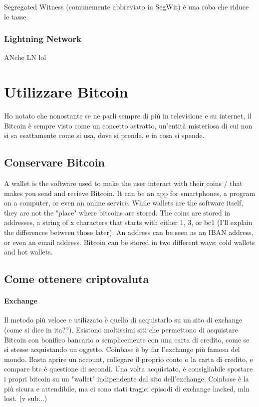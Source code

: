 \documentclass {article}
\begin{document}
Segregated Witness (comunemente abbreviato in SegWit) è una roba che riduce le tasse


\subsubsection {Lightning Network}


ANche LN lol


\section {Utilizzare Bitcoin}


Ho notato che nonostante se ne parli sempre di più in televisione e su internet, il Bitcoin è sempre visto come un concetto astratto, un'entità misteriosa di cui non si sa esattamente come si usa, dove si prende, e in cosa si spende.


\subsection {Conservare Bitcoin}


A wallet is the software used to make the user interact with their coins / that makes you send and recieve Bitcoin.
It can be an app for smartphones, a program on a computer, or even an online service.
While wallets are the software itself, they are not the "place" where bitcoins are stored. The coins are stored in addresses, a string of x characters that starts with either 1, 3, or bc1 (I'll explain the differences between those later). An address can be seen as an IBAN address, or even an email address.
Bitcoin can be stored in two different ways: cold wallets and hot wallets.


\subsection {Come ottenere criptovaluta}


\paragraph {Exchange}


Il metodo più veloce e utilizzato è quello di acquistarlo su un sito di exchange (come si dice in ita??). Esistono moltissimi siti che permettono di acquistare Bitcoin con bonifico bancario o semplicemente con una carta di credito, come se si stesse acquistando un oggetto.
Coinbase è by far l'exchange più famosa del mondo. Basta aprire un account, collegare il proprio conto o la carta di credito, e compare btc è questione di secondi.
Una volta acquistato, è consigliabile spostare i propri bitcoin su un "wallet" indipendente dal sito dell'exchange. Coinbase è la più sicura e attendibile, ma ci sono stati tragici episodi di exchange hacked, mln lost. (v sub...)
\end{document}
